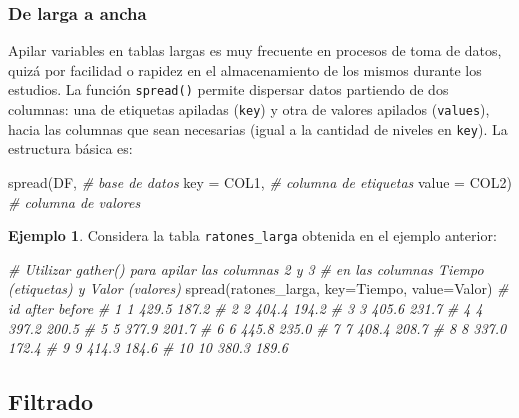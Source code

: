 \documentclass[
]{article}
\newenvironment{Shaded}{\begin{snugshade}}{\end{snugshade}}
\newcommand{\AttributeTok}[1]{\textcolor[rgb]{0.77,0.63,0.00}{#1}}
\newcommand{\CommentTok}[1]{\textcolor[rgb]{0.56,0.35,0.01}{\textit{#1}}}
\newcommand{\FunctionTok}[1]{\textcolor[rgb]{0.00,0.00,0.00}{#1}}
\newcommand{\NormalTok}[1]{#1}
\theoremstyle{definition}
\theoremstyle{definition}
\newtheorem{example}{Ejemplo}[section]
\theoremstyle{definition}
\theoremstyle{definition}
\theoremstyle{remark}
\begin{document}
\hypertarget{de-larga-a-ancha}{%
\subsubsection{De larga a ancha}\label{de-larga-a-ancha}}

Apilar variables en tablas largas es muy frecuente en procesos de toma de datos, quizá por facilidad o rapidez en el almacenamiento de los mismos durante los estudios. La función \texttt{spread()} permite dispersar datos partiendo de dos columnas: una de etiquetas apiladas (\texttt{key}) y otra de valores apilados (\texttt{values}), hacia las columnas que sean necesarias (igual a la cantidad de niveles en \texttt{key}). La estructura básica es:

\begin{Shaded}
\begin{Highlighting}[]
\FunctionTok{spread}\NormalTok{(DF,           }\CommentTok{\# base de datos}
       \AttributeTok{key =}\NormalTok{ COL1,   }\CommentTok{\# columna de etiquetas}
       \AttributeTok{value =}\NormalTok{ COL2) }\CommentTok{\# columna de valores}
\end{Highlighting}
\end{Shaded}

\begin{example}

Considera la tabla \texttt{ratones\_larga} obtenida en el ejemplo anterior:

\begin{Shaded}
\begin{Highlighting}[]
\CommentTok{\# Utilizar gather() para apilar las columnas 2 y 3}
\CommentTok{\# en las columnas Tiempo (etiquetas) y Valor (valores)}
\FunctionTok{spread}\NormalTok{(ratones\_larga, }\AttributeTok{key=}\NormalTok{Tiempo, }\AttributeTok{value=}\NormalTok{Valor)}
\CommentTok{\#    id after before}
\CommentTok{\# 1   1 429.5  187.2}
\CommentTok{\# 2   2 404.4  194.2}
\CommentTok{\# 3   3 405.6  231.7}
\CommentTok{\# 4   4 397.2  200.5}
\CommentTok{\# 5   5 377.9  201.7}
\CommentTok{\# 6   6 445.8  235.0}
\CommentTok{\# 7   7 408.4  208.7}
\CommentTok{\# 8   8 337.0  172.4}
\CommentTok{\# 9   9 414.3  184.6}
\CommentTok{\# 10 10 380.3  189.6}
\end{Highlighting}
\end{Shaded}

\end{example}

\hypertarget{filtrado}{%
\subsection{Filtrado}\label{filtrado}}
\end{document}
